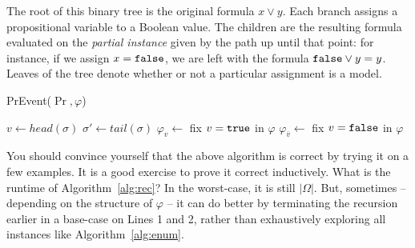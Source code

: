 \documentclass{tufte-handout}
\begin{document}
The root of this binary tree is the original formula $x \lor y$. Each branch 
assigns a propositional variable to a Boolean value. The children are 
the resulting formula evaluated on the \emph{partial instance} given by the 
path up until that point: for instance, if we assign $x = \texttt{false}$, we are left 
with the formula $\texttt{false} \lor y = y$. Leaves of the tree denote whether or not a 
particular assignment is a model.\sidenote{}

\begin{algorithm}
    \caption{PrEvent($\Pr, \varphi$)}
    $v \leftarrow head(\sigma)$\;
    $\sigma' \leftarrow tail(\sigma)$\;
    $ \varphi_v \leftarrow $ fix $v = \texttt{true}$ in $\varphi$\;
    $ \varphi_{\overline{v}} \leftarrow $ fix $v = \texttt{false}$ in $\varphi$\;
    \label{alg:rec}
\end{algorithm}

You should convince yourself that the above algorithm is correct by trying it on a few examples. 
It is a good exercise to prove it correct inductively.
What is the runtime of Algorithm~\ref{alg:rec}? In the worst-case, it is still $|\Omega|$. But, 
sometimes -- depending on the structure of $\varphi$ -- it can do better by terminating the 
recursion earlier in a base-case on Lines 1 and 2, rather than exhaustively exploring all 
instances like Algorithm~\ref{alg:enum}.



\end{document}

